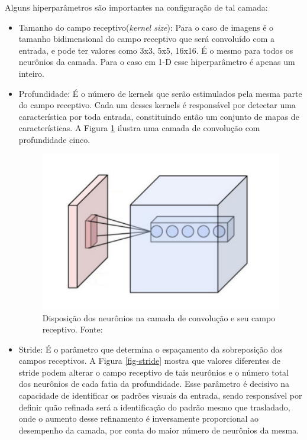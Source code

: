 Alguns hiperparâmetros são importantes na configuração de tal camada\cite{guedes2017}:

\begin{itemize}
	\item Tamanho do campo receptivo(\textit{kernel size}): Para o caso de imagens é o tamanho bidimensional do campo receptivo que será convoluído com a entrada, e pode ter valores como 3x3, 5x5, 16x16. É o mesmo para todos os neurônios da camada. Para o caso em 1-D esse hiperparâmetro  é apenas um inteiro.
	\item Profundidade: É o número de kernels que serão estimulados pela mesma parte do campo receptivo. Cada um desses kernels é responsável por detectar uma característica por toda entrada, constituindo então um conjunto de mapas de características. A Figura \ref{fig-depth} ilustra uma camada de convolução com profundidade cinco.
	
	\begin{figure}[h]
		\centering
		\includegraphics[scale=0.4]{pasta1_figuras/depth_cnn.png}
		\caption{Disposição dos neurônios na camada de convolução e seu campo receptivo. Fonte: \cite{depth}}
		
		\label{fig-depth}
	\end{figure}
	
	\item Stride: É o parâmetro que determina o espaçamento da sobreposição dos campos receptivos. A Figura \ref{fig-stride} mostra que valores diferentes de stride podem alterar o campo receptivo de tais neurônios e o número total dos neurônios de cada fatia da profundidade. Esse parâmetro é decisivo na capacidade de identificar os padrões visuais da entrada, sendo responsável por definir quão refinada será a identificação do padrão mesmo que trasladado, onde o aumento desse refinamento é inversamente proporcional ao desempenho da camada, por conta do maior número de neurônios da mesma.
	

\end{itemize}
